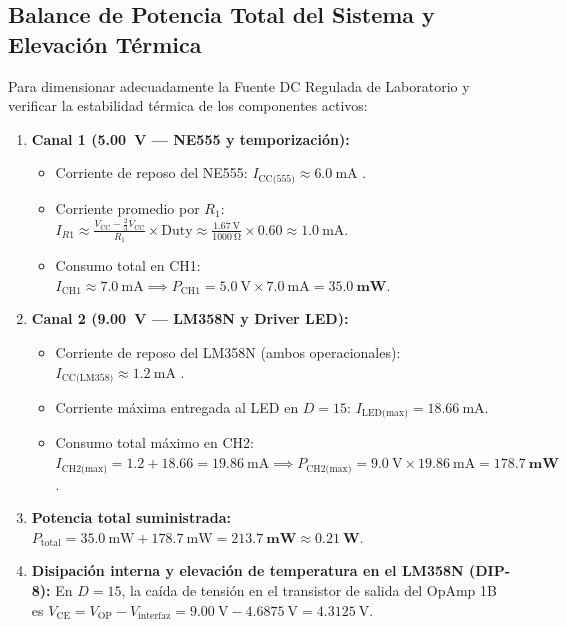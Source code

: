 \documentclass[11pt,letterpaper]{article}
\begin{document}
\subsection{Balance de Potencia Total del Sistema y Elevación Térmica}
Para dimensionar adecuadamente la Fuente DC Regulada de Laboratorio y verificar la estabilidad térmica de los componentes activos:
\begin{enumerate}
    \item \textbf{Canal 1 (\SI{+5.00}{\volt} --- NE555 y temporización):}
    \begin{itemize}
        \item Corriente de reposo del NE555: $I_{\text{CC(555)}} \approx \SI{6.0}{\milli\ampere}$ \cite{ti_ne555}.
        \item Corriente promedio por $R_1$: $I_{R1} \approx \frac{V_{\text{CC}} - \frac{2}{3}V_{\text{CC}}}{R_1} \times \mathrm{Duty} \approx \frac{\SI{1.67}{\volt}}{\SI{1000}{\ohm}} \times 0.60 \approx \SI{1.0}{\milli\ampere}$.
        \item Consumo total en CH1: $I_{\text{CH1}} \approx \SI{7.0}{\milli\ampere} \implies P_{\text{CH1}} = \SI{5.0}{\volt} \times \SI{7.0}{\milli\ampere} = \mathbf{\SI{35.0}{\milli\watt}}$.
    \end{itemize}
    \item \textbf{Canal 2 (\SI{+9.00}{\volt} --- LM358N y Driver LED):}
    \begin{itemize}
        \item Corriente de reposo del LM358N (ambos operacionales): $I_{\text{CC(LM358)}} \approx \SI{1.2}{\milli\ampere}$ \cite{ti_lm358}.
        \item Corriente máxima entregada al LED en $D=15$: $I_{\text{LED(max)}} = \SI{18.66}{\milli\ampere}$.
        \item Consumo total máximo en CH2: $I_{\text{CH2(max)}} = 1.2 + 18.66 = \SI{19.86}{\milli\ampere} \implies P_{\text{CH2(max)}} = \SI{9.0}{\volt} \times \SI{19.86}{\milli\ampere} = \mathbf{\SI{178.7}{\milli\watt}}$.
    \end{itemize}
    \item \textbf{Potencia total suministrada:} $P_{\text{total}} = \SI{35.0}{\milli\watt} + \SI{178.7}{\milli\watt} = \mathbf{\SI{213.7}{\milli\watt}} \approx \mathbf{\SI{0.21}{\watt}}$.
    \item \textbf{Disipación interna y elevación de temperatura en el LM358N (DIP-8):}
    En $D=15$, la caída de tensión en el transistor de salida del OpAmp 1B es $V_{\text{CE}} = V_{\text{OP}} - V_{\text{interfaz}} = \SI{9.00}{\volt} - \SI{4.6875}{\volt} = \SI{4.3125}{\volt}$.

\end{enumerate}
\end{document}

